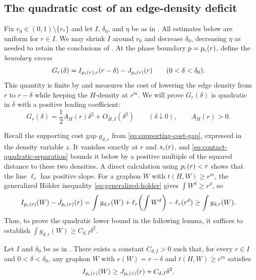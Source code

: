 \subsection{The quadratic cost of an edge-density deficit}\label{sec:nonexceptional-quadratic-growth}

Fix $r_0\in(0,1)\setminus\{r_*\}$ and let $I$, $\delta_0$, and $\eta$ be as in
.  All estimates below are uniform for
$r\in I$.  We may shrink $I$ around $r_0$ and decrease $\delta_0$, decreasing
$\eta$ as needed to retain the conclusions of .
At the phase boundary $p=\pc(r)$, define the \emph{boundary excess}
\begin{equation}\label{eq:boundary-excess}
  G_r(\delta)=I_{\pc(r),r}(r-\delta)-J_{\pc(r)}(r)
  \qquad (0<\delta<\delta_0).
\end{equation}
This quantity is finite by  and measures
the cost of lowering the edge density from $r$ to $r-\delta$
while keeping the $H$-density at $r^m$.  We will prove $G_r(\delta)$ is quadratic in $\delta$
with a positive leading coefficient:
\[
  G_r(\delta)=\frac12A_H(r)\delta^2+O_{H,I}(\delta^3)
  \qquad (\delta\downarrow0),
  \qquad A_H(r)>0.
\]

Recall the supporting cost gap $g_{d,r}$ from \eqref{eq:supporting-cost-gap},
expressed in the density variable $z$.  It vanishes exactly at $r$ and
$\sc(r)$, and \eqref{eq:contact-quadratic-separation} bounds it
below by a positive multiple of the squared distance to these two densities.
A direct calculation using $\pc(r)<r$ shows that the line $\ell_r$ has positive slope.
For a graphon $W$ with $t(H,W)\ge r^m$, the generalized H\"older inequality
\eqref{eq:generalized-holder} gives $\int W^d\ge r^d$, so
\[
  I_{\pc(r)}(W)-J_{\pc(r)}(r)
  =\int g_{d,r}(W)+\ell_r\!\left(\int W^d\right)-\ell_r(r^d)
  \ge\int g_{d,r}(W).
\]
Thus, to prove the quadratic lower bound in the following lemma, it suffices
to establish $\int g_{d,r}(W)\ge C_{d,I}\delta^2$.

\begin{lemma}\label{lem:quadratic-lower-bound}
Let $I$ and $\delta_0$ be as in .
There exists a constant $C_{d,I}>0$ such that, for every $r\in I$ and
$0<\delta<\delta_0$, any graphon $W$ with $e(W)=r-\delta$ and $t(H,W)\ge r^m$ satisfies
\begin{equation}\label{eq:quadratic-lower-bound}
  I_{\pc(r)}(W)\ge J_{\pc(r)}(r)+C_{d,I}\delta^2.
\end{equation}
\end{lemma}


